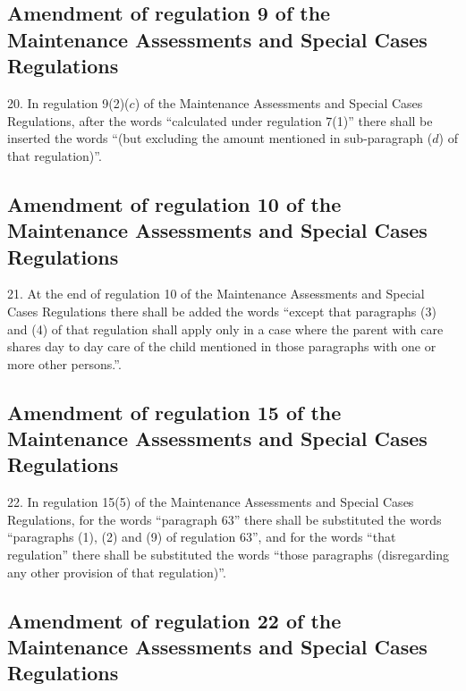 \documentclass[12pt,a4paper]{article}
\begin{document}
\subsection[20. Amendment of regulation 9 of the Maintenance Assessments and Special Cases Regulations]{Amendment of regulation 9 of the Maintenance Assessments and Special Cases Regulations}

20.  In regulation 9(2)($c$) of the Maintenance Assessments and Special Cases Regulations, after the words “calculated under regulation 7(1)” there shall be inserted the words “(but excluding the amount mentioned in sub-paragraph ($d$) of that regulation)”.

\subsection[21. Amendment of regulation 10 of the Maintenance Assessments and Special Cases Regulations]{Amendment of regulation 10 of the Maintenance Assessments and Special Cases Regulations}

21.  At the end of regulation 10 of the Maintenance Assessments and Special Cases Regulations there shall be added the words “except that paragraphs (3) and (4) of that regulation shall apply only in a case where the parent with care shares day to day care of the child mentioned in those paragraphs with one or more other persons.”.

\subsection[22. Amendment of regulation 15 of the Maintenance Assessments and Special Cases Regulations]{Amendment of regulation 15 of the Maintenance Assessments and Special Cases Regulations}

22.  In regulation 15(5) of the Maintenance Assessments and Special Cases Regulations, for the words “paragraph 63” there shall be substituted the words “paragraphs (1), (2) and (9) of regulation 63”, and for the words “that regulation” there shall be substituted the words “those paragraphs (disregarding any other provision of that regulation)”.

\subsection[23. Amendment of regulation 22 of the Maintenance Assessments and Special Cases Regulations]{Amendment of regulation 22 of the Maintenance Assessments and Special Cases Regulations}
\end{document}
